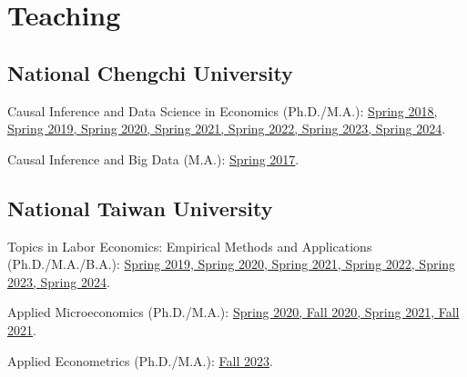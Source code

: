 \documentclass[10pt,letterpaper]{article}
\renewenvironment{itemize}{
  \begin{list}{}{
      \setlength{\leftmargin}{1.5em}
      \setlength{\itemsep}{0.25em}
      \setlength{\parskip}{0pt}
      \setlength{\parsep}{0.25em}
    }
}{
  \end{list}
}
\begin{document}
\section*{\textbf{Teaching}}

\subsection*{National Chengchi University}

\begin{itemize}
\item Causal Inference and Data Science in Economics (Ph.D./M.A.):
  \href{https://causaldatalab.wordpress.com/teaching/}{Spring 2018, Spring 2019, Spring 2020, Spring 2021, Spring 2022, Spring 2023, Spring 2024}.
\item Causal Inference and Big Data (M.A.):
  \href{https://causaldatalab.wordpress.com/2017/02/24/causal-inference-and-big-data-spring-2017/}{Spring 2017}.
\end{itemize}


\subsection*{National Taiwan University}

\begin{itemize}
	\item Topics in Labor Economics: Empirical Methods and Applications  (Ph.D./M.A./B.A.):
	\href{https://sites.google.com/view/cpelab/teaching?authuser=0}{Spring 2019, Spring 2020, Spring 2021, Spring 2022, Spring 2023, Spring 2024}.
	\item Applied Microeconomics  (Ph.D./M.A.):
	\href{https://sites.google.com/view/cpelab/teaching?authuser=0}{Spring 2020, Fall 2020, Spring 2021, Fall 2021}.
		\item Applied Econometrics  (Ph.D./M.A.):
	\href{https://causaldatalab.wordpress.com/teaching/}{Fall 2023}.


\end{itemize}
\end{document}
